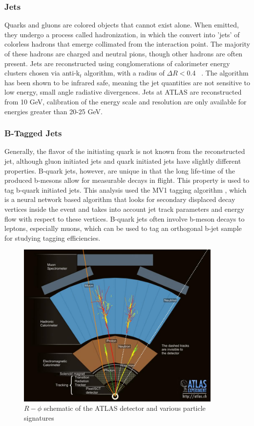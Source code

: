\subsubsection{Jets}

Quarks and gluons are colored objects that cannot exist alone. When emitted, they undergo a process called hadronization, in which the convert into 'jets' of colorless hadrons that emerge collimated from the interaction point. The majority of these hadrons are charged and neutral pions, though other hadrons are often present. Jets are reconstructed using conglomerations of calorimeter energy clusters chosen via anti-k$_t$ algorithm, with a radius of $\Delta R <$0.4 ~\cite{Cacciari:2008gp}. The algorithm has been shown to be infrared safe, meaning the jet quantities are not sensitive to low energy, small angle radiative divergences. Jets at ATLAS are reconstructed from 10 GeV, calibration of the energy scale and resolution are only available for energies greater than 20-25 GeV. 

\subsubsection{B-Tagged Jets}
Generally, the flavor of the initiating quark is not known from the reconstructed jet, although gluon initiated jets and quark initiated jets have slightly different properties. B-quark jets, however, are unique in that the long life-time of the produced b-mesons allow for measurable decays in flight. This property is used to tag b-quark initiated jets. This analysis used the MV1 tagging algorithm \cite{ATLAS-CONF-2011-102}, which is a neural network based algorithm that looks for secondary displaced decay vertices inside the event and takes into account jet track parameters and energy flow with respect to these vertices. B-quark jets often involve b-meson decays to leptons, especially muons, which can be used to tag an orthogonal b-jet sample for studying tagging efficiencies.

\begin{figure}
\centering 
\includegraphics[width=0.9\textwidth]{figs/lhc/particles.jpeg}
\caption{$R-\phi$ schematic of the ATLAS detector and various particle signatures}
\label{figure:lhc_particles}
\end{figure}



